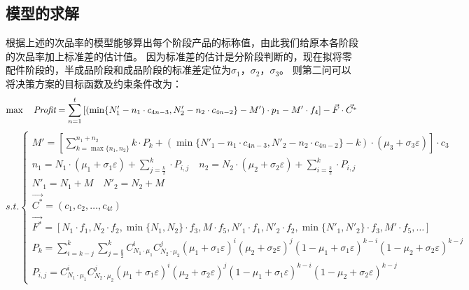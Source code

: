 \documentclass[withoutpreface,bwprint]{cumcmthesis} %
\begin{document}
\subsection{模型的求解}
根据上述的次品率的模型能够算出每个阶段产品的标称值，由此我们给原本各阶段的次品率加上标准差的估计值。
因为标准差的估计是分阶段判断的，现在拟将零配件阶段的，半成品阶段和成品阶段的标准差定位为$\sigma_{1}$，$\sigma_{2}$，$\sigma_{3}$。
则第二问可以将决策方案的目标函数及约束条件改为：
$$	\max \quad  \textit{Profit}=\sum_{n=1}^{t}\left [  (\min \{N'_{1}-n_{1}\cdot c_{4n-3},N'_{2}-n_{2}\cdot c_{4n-2}\}-M')\cdot p_{1}-M'\cdot f_{4} \right ] -\vec{F}\cdot \vec{C^{*}}\\$$
\begin{equation*}
	s.t.\begin{cases}
		M'=[\sum_{k=\max \{n_{1},n_{2}\}}^{n_{1}+n_{2}}k\cdot P_{k}+(\min \{N'_{1}-n_{1}\cdot c_{4n-3},N'_{2}-n_{2}\cdot c_{4n-2}\}-k)\cdot (\mu_{3}+\sigma_{3}\varepsilon )]\cdot c_{3}                                \\
		n_{1}=N_{1}\cdot (\mu_{1}+\sigma_{1}\varepsilon )+\sum_{j=\frac{k}{2}}^{k}\cdot P_{i,j} \quad n_{2}=N_{2}\cdot (\mu_{2}+\sigma_{2}\varepsilon )+\sum_{i=\frac{k}{2}}^{k}\cdot P_{i,j}                                                    \\
		N'_{1}=N_{1}+M \quad N'_{2}=N_{2}+M                                                                                                                                                    \\
		\vec{C^{*}}=(c_{1},c_{2},\dots,c_{4t})                                                                                                                                                 \\
		\vec{F^{*}}=[N_{1}\cdot f_{1},N_{2}\cdot f_{2},\min \{N_{1},N_{2}\}\cdot f_{3},M\cdot f_{5},N'_{1}\cdot f_{1},N'_{2}\cdot f_{2},\min \{N'_{1},N'_{2}\}\cdot f_{3},M'\cdot f_{5},\dots] \\
		P_{k}=\sum_{i=k-j}^{k}\sum_{j=\frac{k}{2}}^{k}C_{N_{1}\cdot\mu_{1}}^{i}C_{N_{2}\cdot\mu_{2}}^{j}(\mu_{1}+\sigma_{1}\varepsilon)^{i}(\mu_{2}+\sigma_{2}\varepsilon)^{j}(1-\mu_{1}+\sigma_{1}\varepsilon)^{k-i}(1-\mu_{2}+\sigma_{2}\varepsilon)^{k-j}                               \\
		P_{i,j}=C_{N_{1}\cdot\mu_{1}}^{i}C_{N_{2}\cdot\mu_{2}}^{j}(\mu_{1}+\sigma_{1}\varepsilon)^{i}(\mu_{2}+\sigma_{2}\varepsilon)^{j}(1-\mu_{1}+\sigma_{1}\varepsilon)^{k-i}(1-\mu_{2}+\sigma_{2}\varepsilon)^{k-j}   
	\end{cases}
\end{equation*}
\end{document}
